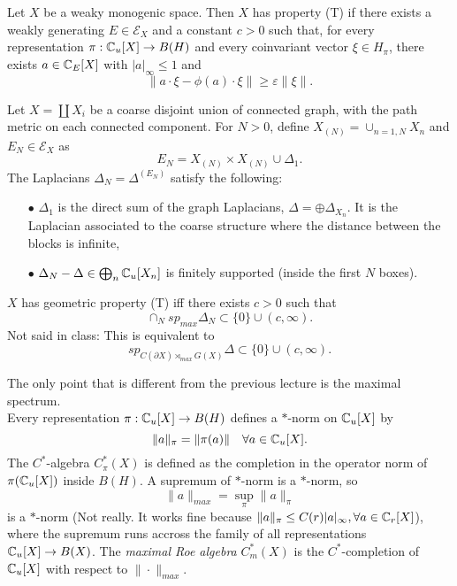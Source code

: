 \begin{definition}
Let $X$ be a weaky monogenic space. Then $X$ has property (T) if there exists a weakly generating $E \in \mathcal E_X$ and a constant $c>0$ such that, for every representation $\pi : \mathbb C_u [X]\rightarrow B(H)$ and every coinvariant vector $\xi \in H_\pi$, there exists $a\in \mathbb C_E[X]$ with $|a|_\infty\leq 1$ and 
\[ \|a\cdot \xi - \phi(a)	\cdot \xi\| \geq \varepsilon \|\xi \|.\]
\end{definition}

Let $X=\coprod X_i$ be a coarse disjoint union of connected graph, with the path metric on each connected component. For $N>0$, define $X_{(N)} = \cup_{n=1,N} X_n$ and $E_N \in \mathcal E_X$ as
\[E_N= X_{(N)}\times X_{(N)} \cup \Delta_1.\]
The Laplacians $\Delta_N = \Delta^{(E_N)}$ satisfy the following:
\begin{itemize}
\item[$\bullet$] $\Delta_1$ is the direct sum of the graph Laplacians, $\Delta=\oplus \Delta_{X_n}$. It is the Laplacian associated to the coarse structure where the distance between the blocks is infinite, 
\item[$\bullet$] $\Delta_N - \Delta \in \bigoplus_n \mathbb C_u[X_n]$ is finitely supported (inside the first $N$ boxes).
\end{itemize} 

\begin{prop}
$X$ has geometric property (T) iff there exists $c>0$ such that
\[\cap_N sp_{max}\Delta_N \subset \{0\}\cup (c , \infty). \]
Not said in class: This is equivalent to 
\[sp_{C(\partial X)\rtimes_{max} G(X)}\Delta \subset \{0\}\cup (c , \infty).\]
\end{prop}

The only point that is different from the previous lecture is the maximal spectrum.\\

Every representation $\pi : \mathbb C_u[X]\rightarrow B(H)$ defines a $*$-norm on $\mathbb C_u[X]$ by 
\[\|a\|_\pi = \|\pi(a)\| \quad \forall a\in \mathbb C_u[X]. \] 
The $C^*$-algebra $C^*_\pi(X)$ is defined as the completion in the operator norm of $\pi(\mathbb C_u[X] )$ inside $B(H)$. A supremum of $*$-norm is a $*$-norm, so 
\[\|a\|_{max} = \sup_{\pi } \| a \|_\pi\]
is a $*$-norm (Not really. It works fine because $\|a\|_\pi \leq C(r) |a|_\infty, \forall a \in \mathbb C_r[X]$), where the supremum runs accross the family of all representations $\mathbb C_u[X]\rightarrow B(X)$. The \textit{maximal Roe algebra} $C^*_m(X)$ is the $C^*$-completion of $\mathbb C_u[X]$ with respect to $\|\cdot \|_{max}$.\\

